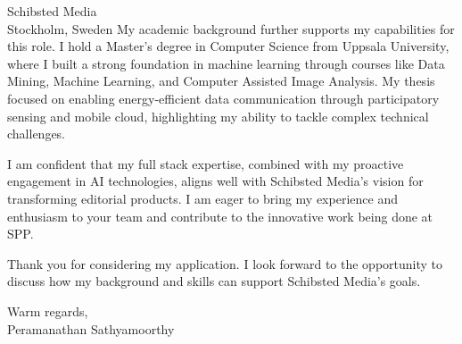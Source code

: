 \documentclass{letter}
\begin{document}
\begin{letter}{Schibsted Media\\
Stockholm, Sweden}
My academic background further supports my capabilities for this role.
I hold a Master's degree in Computer Science from Uppsala University, where I built a strong foundation in machine learning through courses like Data Mining, Machine Learning, and Computer Assisted Image Analysis.
My thesis focused on enabling energy-efficient data communication through participatory sensing and mobile cloud, highlighting my ability to tackle complex technical challenges.

I am confident that my full stack expertise, combined with my proactive engagement in AI technologies, aligns well with Schibsted Media's vision for transforming editorial products.
I am eager to bring my experience and enthusiasm to your team and contribute to the innovative work being done at SPP.

Thank you for considering my application. I look forward to the opportunity to discuss how my background and skills can support Schibsted Media's goals.

\closing{Warm regards,\\ Peramanathan Sathyamoorthy}

\end{letter}
\end{document}
